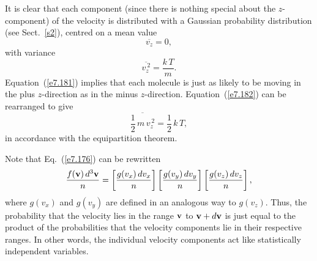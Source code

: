 It is clear that each component (since there is nothing special about the $z$-component) of the velocity is distributed with a Gaussian probability distribution
(see Sect.~\ref{s2}),
centred on a mean value
\begin{equation}
\overline{v_z} = 0,\label{e7.181}
\end{equation}
with variance
\begin{equation}
\overline{v_z^{~2}} = \frac{k\,T}{m}.\label{e7.182}
\end{equation}
Equation~(\ref{e7.181}) implies that each molecule is just as likely to be moving in the
plus $z$-direction as in the minus $z$-direction. Equation~(\ref{e7.182}) can be rearranged
to give
\begin{equation}
\overline{\frac{1}{2}\,m\, v_z^{~2}} = \frac{1}{2}\, k\,T,
\end{equation}
in accordance with the equipartition theorem. 

Note that Eq.~(\ref{e7.176}) can be rewritten
\begin{equation}
\frac{ f({\bf v}) \, d^3{\bf v}}{n} =\left[\frac{g(v_x)\,dv_x}{n}\right]
\left[\frac{g(v_y)\,dv_y}{n}\right]\left[\frac{g(v_z)\,dv_z}{n}\right],
\end{equation}
where $g(v_x)$ and $g(v_y)$ are defined in an analogous way to $g(v_z)$. 
Thus, the probability that the velocity lies in the range ${\bf v}$ to
${\bf v} + d{\bf v}$ is just equal to the product of the probabilities
that the velocity components lie in their respective ranges.
In other words, the individual
velocity components act like statistically independent variables.

